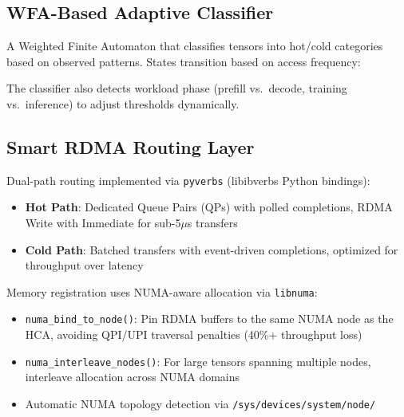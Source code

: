 \documentclass[10pt,letterpaper]{article}
\begin{document}
\subsection{WFA-Based Adaptive Classifier}
A Weighted Finite Automaton that classifies tensors into hot/cold categories based on observed patterns. States transition based on access frequency:

\begin{center}
\end{center}

The classifier also detects workload phase (prefill vs.\ decode, training vs.\ inference) to adjust thresholds dynamically.

\subsection{Smart RDMA Routing Layer}
Dual-path routing implemented via \texttt{pyverbs} (libibverbs Python bindings):

\begin{itemize}[noitemsep]
    \item \textbf{Hot Path}: Dedicated Queue Pairs (QPs) with polled completions, RDMA Write with Immediate for sub-5$\mu$s transfers
    \item \textbf{Cold Path}: Batched transfers with event-driven completions, optimized for throughput over latency
\end{itemize}

Memory registration uses NUMA-aware allocation via \texttt{libnuma}:
\begin{itemize}[noitemsep]
    \item \texttt{numa\_bind\_to\_node()}: Pin RDMA buffers to the same NUMA node as the HCA, avoiding QPI/UPI traversal penalties (40\%+ throughput loss)
    \item \texttt{numa\_interleave\_nodes()}: For large tensors spanning multiple nodes, interleave allocation across NUMA domains
    \item Automatic NUMA topology detection via \texttt{/sys/devices/system/node/}
\end{itemize}
\end{document}
